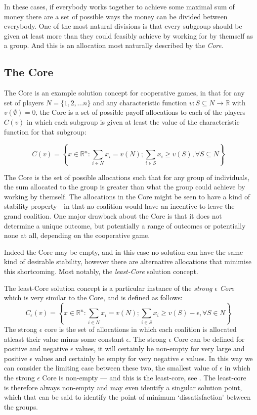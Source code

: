 In these cases, if everybody works together to achieve some maximal sum of money there are a set of possible ways the money can be divided between everybody.
One of the most natural divisions is that every subgroup should be given at least more than they could feasibly achieve by working for by themself as a group.
And this is an allocation most naturally described by the \textit{Core}.

\subsection{The Core}\DIFaddbegin \label{sec:the_core_definition}
\DIFaddend 

The Core is an example solution concept for cooperative games, in that for any set of players $N=\{1,2,\dots n\}$ and any characteristic function $v: S\subseteq N \rightarrow \mathbb{R}$ with $v(\emptyset)=0$, the Core is a set of possible payoff allocations to each of the players $C(v)$ in which each subgroup is given at least the value of the characteristic function for that subgroup:

$$ C(v) = \left\{x\in\mathbb{R}^n : \sum_{i\in N}x_i=v(N); \sum_{i\in S}x_i \ge v(S), \forall S\subseteq N \right\}$$

The Core is the set of possible allocations such that for any group of individuals, the sum allocated to the group is greater than what the group could achieve by working by themself.
The allocations in the Core might be seen to have a kind of stability property - in that no coalition would have an incentive to leave the grand coalition. One major drawback about the Core is that it does not determine a unique outcome, but potentially a range of outcomes or potentially none at all, depending on the cooperative game.

Indeed the Core may be empty, and in this case no solution can have the same kind of desirable stability, however there are alternative allocations that minimise this shortcoming.
Most notably, the \textit{least-Core} solution concept.

The least-Core solution concept is a particular instance of the \textit{strong $\epsilon$ Core} which is very similar to the Core, and is defined as follows:
$$ C_\epsilon(v) = \left\{x\in\mathbb{R}^n : \sum_{i\in N}x_i=v(N); \sum_{i\in S}x_i \ge v(S)-\epsilon, \forall S\in N \right\}$$
The strong $\epsilon$ core is the set of allocations in which each coalition is allocated atleast their value minus some constant $\epsilon$.
The strong $\epsilon$ Core can be defined for positive and negative $\epsilon$ values, it will certainly be non-empty for very large and positive $\epsilon$ values and certainly be empty for very negative $\epsilon$ values.
In this way we can consider the limiting case between these two, the smallest value of $\epsilon$ in which the strong $\epsilon$ Core is non-empty --- and this is the least-core, see \cite{doi:10.1287/moor.4.4.303}.
The least-core is therefore always non-empty and may even identify a singular solution point, which that can be said to identify the point of minimum `dissatisfaction' between the groups.

